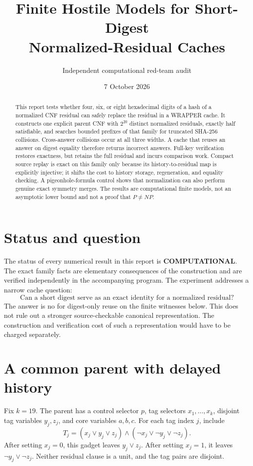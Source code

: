 \documentclass[11pt]{article}
\title{Finite Hostile Models for Short-Digest\\Normalized-Residual Caches}
\author{Independent computational red-team audit}
\date{7 October 2026}
\begin{document}
\maketitle

\begin{abstract}
This report tests whether four, six, or eight hexadecimal digits of a hash of
a normalized CNF residual can safely replace the residual in a WRAPPER cache.
It constructs one explicit parent CNF with $2^{20}$ distinct normalized
residuals, exactly half satisfiable, and searches bounded prefixes of that
family for truncated SHA-256 collisions.  Cross-answer collisions occur at
all three widths.  A cache that reuses an answer on digest equality therefore
returns incorrect answers.  Full-key verification restores exactness, but
retains the full residual and incurs comparison work.  Compact source replay
is exact on this family only because its history-to-residual map is explicitly
injective; it shifts the cost to history storage, regeneration, and equality
checking.  A pigeonhole-formula control shows that normalization can also
perform genuine exact symmetry merges.  The results are computational finite
models, not an asymptotic lower bound and not a proof that $P\ne NP$.
\end{abstract}

\section{Status and question}

The status of every numerical result in this report is
\textbf{COMPUTATIONAL}.  The exact family facts are elementary consequences
of the construction and are verified independently in the accompanying
program.  The experiment addresses a narrow cache question:
\[
  \text{Can a short digest serve as an exact identity for a normalized
  residual?}
\]
The answer is no for digest-only reuse on the finite witnesses below.  This
does not rule out a stronger source-checkable canonical representation.  The
construction and verification cost of such a representation would have to be
charged separately.

\section{A common parent with delayed history}

Fix $k=19$.  The parent has a control selector $p$, tag selectors
$x_1,\ldots,x_k$, disjoint tag variables $y_j,z_j$, and core variables
$a,b,c$.  For each tag index $j$, include
\[
 T_j=(x_j\lor y_j\lor z_j)\land
     (\neg x_j\lor\neg y_j\lor\neg z_j).
 \tag{1}
\]
After setting $x_j=0$, this gadget leaves $y_j\lor z_j$.  After setting
$x_j=1$, it leaves $\neg y_j\lor\neg z_j$.  Neither residual clause is a
unit, and the tag pairs are disjoint.
\end{document}
